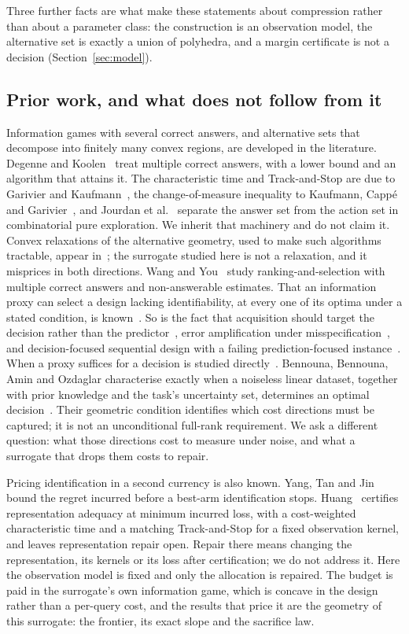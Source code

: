 Three further facts are what make these statements about compression rather than about a
parameter class: the construction is an observation model, the alternative set is exactly a
union of polyhedra, and a margin certificate is not a decision (Section~\ref{sec:model}).

\subsection{Prior work, and what does not follow from it}

Information games with several correct answers, and alternative sets that decompose into
finitely many convex regions, are developed in the literature. Degenne and
Koolen~\cite{degenne2019} treat multiple correct answers, with a lower bound and an algorithm
that attains it. The characteristic time and Track-and-Stop are due to Garivier and
Kaufmann~\cite{garivier2016}, the change-of-measure inequality to Kaufmann, Capp\'e and
Garivier~\cite{kaufmann2016}, and Jourdan et al.~\cite{jourdan2021} separate the answer set from
the action set in combinatorial pure exploration. We inherit that machinery and do not claim
it. Convex relaxations of the alternative geometry, used to make such algorithms tractable,
appear in~\cite{shukla2024}; the surrogate studied here is not a relaxation, and it misprices in
both directions. Wang and You~\cite{wangyou2026} study ranking-and-selection with multiple
correct answers and non-answerable estimates. That an information proxy can select a design
lacking identifiability, at every one of its optima under a stated condition, is
known~\cite{overstall2022}. So is the fact that acquisition should target the decision rather
than the predictor~\cite{filstroff2021}, error amplification under
misspecification~\cite{tang2026}, and decision-focused sequential design with a failing
prediction-focused instance~\cite{wan2026}. When a proxy suffices for a decision is studied
directly~\cite{schutte2026}. Bennouna, Bennouna, Amin and Ozdaglar characterise exactly when a
noiseless linear dataset, together with prior knowledge and the task's uncertainty set,
determines an optimal decision~\cite{bennouna2025,bennouna2026}. Their geometric condition
identifies which cost directions must be captured; it is not an unconditional full-rank
requirement. We ask a different question: what those directions cost to
measure under noise, and what a surrogate that drops them costs to repair.

Pricing identification in a second currency is also known. Yang, Tan and Jin~\cite{yang2024}
bound the regret incurred before a best-arm identification stops. Huang~\cite{huang2026}
certifies representation adequacy at minimum incurred loss, with a cost-weighted
characteristic time and a matching Track-and-Stop for a fixed observation kernel, and leaves
representation repair open. Repair there means changing the representation, its kernels or its
loss after certification; we do not address it. Here the observation model is fixed and only the
allocation is repaired. The budget is paid in the surrogate's own information game, which is
concave in the design rather than a per-query cost, and the results that price it are the
geometry of this surrogate: the frontier, its exact slope and the sacrifice law.

